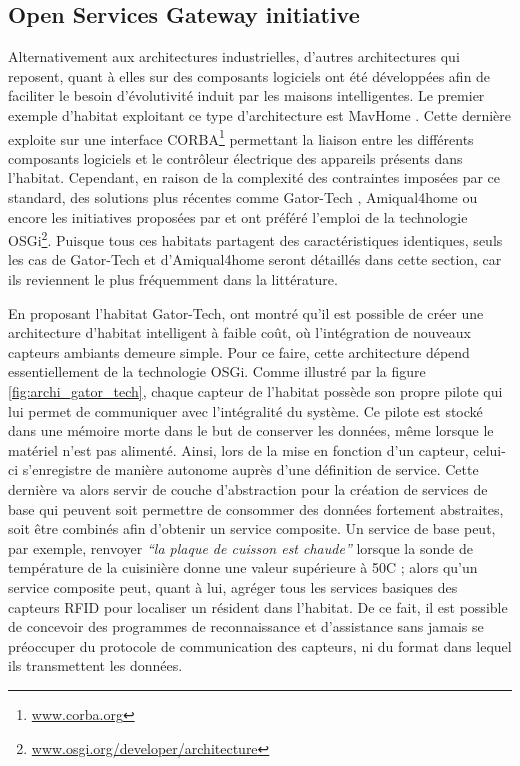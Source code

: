 \subsection{Open Services Gateway initiative}

Alternativement aux architectures industrielles, d'autres architectures qui reposent, quant à elles sur des composants logiciels ont été développées afin de faciliter le besoin d'évolutivité induit par les maisons intelligentes. Le premier exemple d'habitat exploitant ce type d'architecture est MavHome \citep{DJCook2003}. Cette dernière exploite sur une interface \ac{CORBA}\footnote{\url{www.corba.org}} permettant la liaison entre les différents composants logiciels et le contrôleur électrique des appareils présents dans l'habitat. Cependant, en raison de la complexité des contraintes imposées par ce standard, des solutions plus récentes comme Gator-Tech \citep{Helal2005}, Amiqual4home \citep{Lago2017} ou encore les initiatives proposées par \cite{Novak2011} et \cite{Cheng2012} ont préféré l'emploi de la technologie \ac{OSGi}\footnote{\url{www.osgi.org/developer/architecture}}. Puisque tous ces habitats partagent des caractéristiques identiques, seuls les cas de Gator-Tech et d'Amiqual4home seront détaillés dans cette section, car ils reviennent le plus fréquemment dans la littérature.

En proposant l'habitat Gator-Tech, \cite{Helal2005} ont montré qu'il est possible de créer une architecture d'habitat intelligent à faible coût, où l'intégration de nouveaux capteurs ambiants demeure simple. Pour ce faire, cette architecture dépend essentiellement de la technologie \acs{OSGi}. Comme illustré par la figure \ref{fig:archi_gator_tech}, chaque capteur de l'habitat possède son propre pilote qui lui permet de communiquer avec l'intégralité du système. Ce pilote est stocké dans une mémoire morte dans le but de conserver les données, même lorsque le matériel n'est pas alimenté. Ainsi, lors de la mise en fonction d'un capteur, celui-ci s'enregistre de manière autonome auprès d'une définition de service. Cette dernière va alors servir de couche d'abstraction pour la création de services de base qui peuvent soit permettre de consommer des données fortement abstraites, soit être combinés afin d'obtenir un service composite. Un service de base peut, par exemple, renvoyer \textit{``la plaque de cuisson est chaude''} lorsque la sonde de température de la cuisinière donne une valeur supérieure à 50\textdegree{}C ; alors qu'un service composite peut, quant à lui, agréger tous les services basiques des capteurs \ac{RFID} pour localiser un résident dans l'habitat. De ce fait, il est possible de concevoir des programmes de reconnaissance et d'assistance sans jamais se préoccuper du protocole de communication des capteurs, ni du format dans lequel ils transmettent les données.

